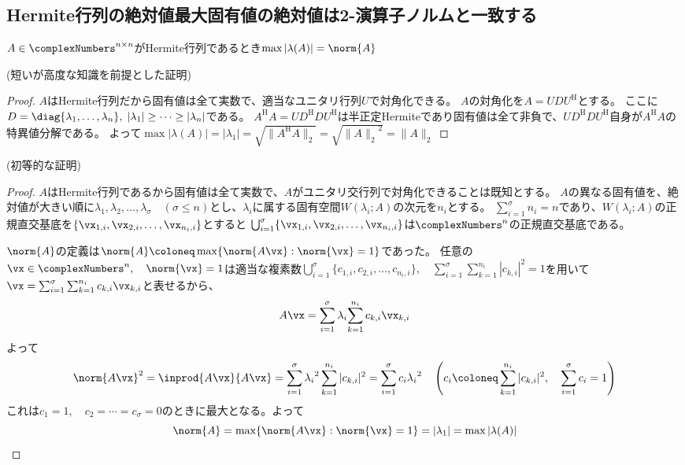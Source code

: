         \subsection{Hermite行列の絶対値最大固有値の絶対値は2-演算子ノルムと一致する}
            \begin{shadebox}
                $A\in\complexNumbers^{n\times n}$がHermite行列であるとき$\max |\lambda(A)| = \norm{A}$
            \end{shadebox}
            \noindent
            (短いが高度な知識を前提とした証明)
            \begin{proof}
                \quad\par
                $A$はHermite行列だから固有値は全て実数で、適当なユニタリ行列$U$で対角化できる。
                $A$の対角化を$A = UDU^\mathrm{H}$とする。
                ここに$D = \diag{\lambda_1,\dotsc,\lambda_n},\;|\lambda_1| \geq \dotsb \geq |\lambda_n|$である。
                $A^\mathrm{H}A = UD^\mathrm{H}DU^\mathrm{H}$は半正定Hermiteであり固有値は全て非負で、$UD^\mathrm{H}DU^\mathrm{H}$自身が$A^\mathrm{H}A$の特異値分解である。
                よって$\max |\lambda(A)| = |\lambda_1| = \sqrt{\|A^\mathrm{H}A\|_2} = \sqrt{{\|A\|_2}^2} = \|A\|_2$
            \end{proof}
            \noindent
            (初等的な証明)
            \begin{proof}
                \quad\par
                $A$はHermite行列であるから固有値は全て実数で、$A$がユニタリ交行列で対角化できることは既知とする。
                $A$の異なる固有値を、絶対値が大きい順に$\lambda_1,\lambda_2,\dotsc,\lambda_\sigma\quad(\sigma\leq n)$とし、$\lambda_i$に属する固有空間$W(\lambda_i;A)$の次元を$n_i$とする。
                $\sum_{i=1}^{\sigma}{n_i} = n$であり、$W(\lambda_i;A)$の正規直交基底を$\{\vx_{1,i},\vx_{2,i},\dotsc,\vx_{n_i,i}\}$とすると
                $\bigcup_{i=1}^{\sigma}\{\vx_{1,i},\vx_{2,i},\dotsc,\vx_{n_i,i}\}$は$\complexNumbers^n$の正規直交基底である。
                \par
                $\norm{A}$の定義は$\norm{A} \coloneq \max\{\norm{A\vx}:\norm{\vx}=1\}$であった。
                任意の$\vx\in\complexNumbers^n,\quad\norm{\vx}=1$は適当な複素数$\bigcup_{i=1}^{\sigma}\{c_{1,i},c_{2,i},\dotsc,c_{n_i,i}\},\quad\sum_{i=1}^{\sigma}{\sum_{k=1}^{n_i}{|c_{k,i}|^2}}=1$を用いて
                $\vx = \sum_{i=1}^{\sigma}{\sum_{k=1}^{n_i}{c_{k,i}\vx_{k,i}}}$と表せるから、
                \[A\vx = \sum_{i=1}^{\sigma}\lambda_i{\sum_{k=1}^{n_i}{c_{k,i}\vx_{k,i}}}\]
                よって
                \[\norm{A\vx}^2 = \inprod{A\vx}{A\vx} = \sum_{i=1}^{\sigma}{{\lambda_i}^2\sum_{k=1}^{n_i}{|c_{k,i}|^2}} = \sum_{i=1}^{\sigma}{c_i{\lambda_i}^2}\quad\left(c_i \coloneq \sum_{k=1}^{n_i}{|c_{k,i}|^2},\quad\sum_{i=1}^{\sigma}{c_i}=1\right)\]
                これは$c_1=1,\quad c_2=\dotsb=c_\sigma=0$のときに最大となる。よって
                \[\norm{A} = \max\{\norm{A\vx}:\norm{\vx}=1\} = |\lambda_1| = \max |\lambda(A)|\]
            \end{proof}
